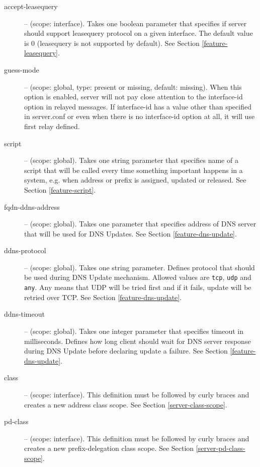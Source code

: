 \begin{description}
\item[accept-leasequery] -- (scope: interface). Takes one boolean
  parameter that specifies if server should support leasequery
  \cite{rfc5007} protocol on a given interface. The default value is
  0 (leasequery is not supported by default). See Section
  \ref{feature-leasequery}.


\item[guess-mode] -- (scope: global, type: present or missing,
  default: missing). When this option is enabled, server will not pay
  close attention to the interface-id option in relayed messages. If
  interface-id has a value other than specified in server.conf or even
  when there is no interface-id option at all, it will use first relay
  defined.

\item[script] -- (scope: global). Takes one string parameter that
  specifies name of a script that will be called every time something
  important happens in a system, e.g. when address or prefix is
  assigned, updated or released. See Section \ref{feature-script}.

\item[fqdn-ddns-address] -- (scope: global). Takes one parameter that
  specifies address of DNS server that will be used for DNS
  Updates. See Section \ref{feature-dns-update}.

\item[ddns-protocol] -- (scope: global). Takes one string
parameter. Defines protocol that should be used during DNS Update
mechanism. Allowed values are \verb+tcp+, \verb+udp+ and \verb+any+.
Any means that UDP will be tried first and if it fails, update will be
retried over TCP. See Section \ref{feature-dns-update}.

\item[ddns-timeout] -- (scope: global). Takes one integer parameter
that specifies timeout in milliseconds. Defines how long client should
wait for DNS server response during DNS Update before declaring
update a failure. See Section \ref{feature-dns-update}.

\item[class] -- (scope: interface). This definition must be followed by
curly braces and creates a new address class scope. See
Section \ref{server-class-scope}.

\item[pd-class] -- (scope: interface). This definition must be
followed by curly braces and creates a new prefix-delegation class
scope. See Section \ref{server-pd-class-scope}.


\end{description}
